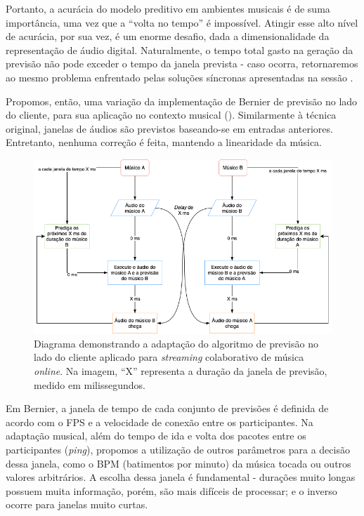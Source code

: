 Portanto, a acurácia do modelo preditivo em ambientes musicais é de suma importância, uma vez que a ``volta no tempo'' é impossível. Atingir esse alto nível de acurácia, por sua vez, é um enorme desafio, dada a dimensionalidade da representação de áudio digital. Naturalmente, o tempo total gasto na geração da previsão não pode exceder o tempo da janela prevista - caso ocorra, retornaremos ao mesmo problema enfrentado pelas soluções síncronas apresentadas na sessão . 

Propomos, então, uma variação da implementação de Bernier \cite{client-side-prediction} de previsão no lado do cliente, para sua aplicação no contexto musical (). Similarmente à técnica original, janelas de áudios são previstos baseando-se em entradas anteriores. Entretanto, nenhuma correção é feita, mantendo a linearidade da música.

\begin{figure}[htbp]
\centering
\includegraphics[width=1\textwidth]{images/rollback-music.png}
\caption{Diagrama demonstrando a adaptação do algoritmo de previsão no lado do cliente aplicado para \textit{streaming} colaborativo de música \textit{online}. Na imagem, ``X'' representa a duração da janela de previsão, medido em milissegundos.}
\label{fig:rollback_music_diagram}
\end{figure}

Em Bernier, a janela de tempo de cada conjunto de previsões é definida de acordo com o FPS e a velocidade de conexão entre os participantes. Na adaptação musical, além do tempo de ida e volta dos pacotes entre os participantes (\textit{ping}), propomos a utilização de outros parâmetros para a decisão dessa janela, como o BPM (batimentos por minuto) da música tocada ou outros valores arbitrários. A escolha dessa janela é fundamental - durações muito longas possuem muita informação, porém, são mais difíceis de processar; e o inverso ocorre para janelas muito curtas.

